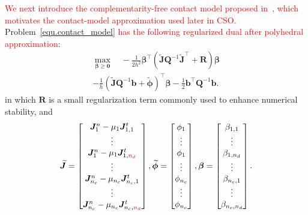 \textcolor{red}{
We next introduce the complementarity-free contact model proposed in~\cite{jin2024complementarity}, which motivates the contact-model approximation used later in CSO.
}
Problem~\eqref{equ.contact_model} \textcolor{red}{has the following regularized dual after polyhedral approximation}:
\begin{multline}
\label{equ.dual_prob_relax}
 \max_{\boldsymbol{\beta}\geq\boldsymbol{0}}
 \quad
 -\frac{1}{2h^{2}}
 \boldsymbol{\beta}^{\top}
 \left(
 \boldsymbol{\widetilde{J}}
 \boldsymbol{Q}^{-1}
 \boldsymbol{\widetilde{J}}^{\top}
 +
 \boldsymbol{R}
 \right)
 \boldsymbol{\beta}
 \\
 -
 \frac{1}{h}
 \left(
 \boldsymbol{\widetilde{J}}
 \boldsymbol{Q}^{-1}
 \boldsymbol{b}
 +
 \boldsymbol{\widetilde{\phi}}
 \right)^{\top}
 \boldsymbol{\beta}
 -
 \frac{1}{2}
 \boldsymbol{b}^{\top}
 \boldsymbol{Q}^{-1}
 \boldsymbol{b}.
\end{multline}
\noindent in which $\boldsymbol{R}$ is a small regularization term commonly used to enhance numerical stability, and
\begin{equation}
\boldsymbol{\widetilde{J}}
=
\begin{bmatrix}
 \boldsymbol{J}_1^n-\mu_1\boldsymbol{J}_{1,1}^t\\
 \vdots\\
 \boldsymbol{J}_1^n-\mu_1\boldsymbol{J}_{1,\mathreplace{n_t}{n_d}}^t\\
 \vdots\\
 \boldsymbol{J}_{n_c}^n-\mu_{n_c}\boldsymbol{J}_{n_c,1}^t\\
 \vdots\\
 \boldsymbol{J}_{n_c}^n-\mu_{n_c}\boldsymbol{J}_{n_c,\mathreplace{n_t}{n_d}}^t
\end{bmatrix},
\boldsymbol{\widetilde{\phi}}
=
\begin{bmatrix}
 \phi_1\\
 \vdots\\
 \phi_1\\
 \vdots\\
 \phi_{n_c}\\
 \vdots\\
 \phi_{n_c}
\end{bmatrix},
\boldsymbol{\beta}
=
\begin{bmatrix}
 \beta_{1,1}\\
 \vdots\\
 \beta_{1,n_d}\\
 \vdots\\
 \beta_{n_c,1}\\
 \vdots\\
 \beta_{n_c,n_d}
\end{bmatrix}.
\end{equation}
